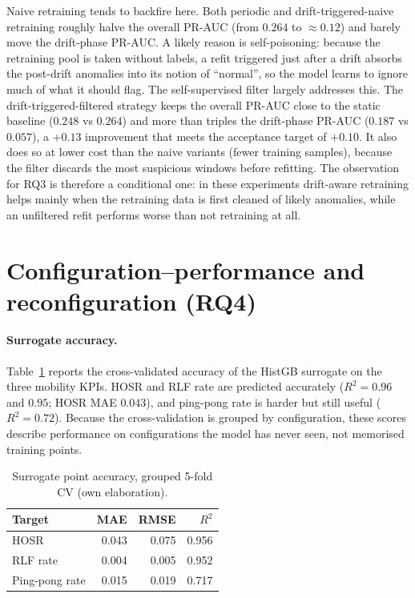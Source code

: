 Naive retraining tends to backfire here. Both periodic and
drift-triggered-naive retraining roughly halve the overall PR-AUC (from $0.264$
to $\approx 0.12$) and barely move the drift-phase PR-AUC. A likely reason is
self-poisoning: because the retraining pool is taken without labels, a refit
triggered just after a drift absorbs the post-drift anomalies into its notion of
``normal'', so the model learns to ignore much of what it should flag. The
self-supervised filter largely addresses this. The drift-triggered-filtered
strategy keeps the overall PR-AUC close to the static baseline ($0.248$ vs
$0.264$) and more than triples the drift-phase PR-AUC ($0.187$ vs $0.057$), a
$+0.13$ improvement that meets the acceptance target of $+0.10$. It also does so
at lower cost than the naive variants (fewer training samples), because the
filter discards the most suspicious windows before refitting. The observation for
RQ3 is therefore a conditional one: in these experiments drift-aware retraining
helps mainly when the retraining data is first cleaned of likely anomalies, while
an unfiltered refit performs worse than not retraining at all.

\section{Configuration--performance and reconfiguration (RQ4)}
\label{sec:res-config}

\paragraph{Surrogate accuracy.}
Table~\ref{tab:surrogate-point} reports the cross-validated accuracy of the
HistGB surrogate on the three mobility KPIs. HOSR and RLF rate are predicted
accurately ($R^2 = 0.96$ and $0.95$; HOSR MAE $0.043$), and ping-pong rate is
harder but still useful ($R^2 = 0.72$). Because the cross-validation is grouped
by configuration, these scores describe performance on configurations the model
has never seen, not memorised training points.

\begin{table}[ht]
\centering
\caption{Surrogate point accuracy, grouped 5-fold CV (own elaboration).}
\label{tab:surrogate-point}
\begin{tabular}{@{}lrrr@{}}
\toprule
Target & MAE & RMSE & $R^2$ \\
\midrule
HOSR           & 0.043 & 0.075 & 0.956 \\
RLF rate       & 0.004 & 0.005 & 0.952 \\
Ping-pong rate & 0.015 & 0.019 & 0.717 \\
\bottomrule
\end{tabular}
\end{table}


